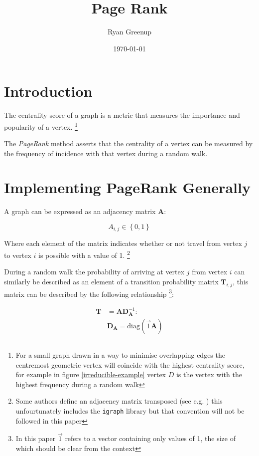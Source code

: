 \documentclass[11pt]{article}
\author{Ryan Greenup}
\date{\today}
\title{Page Rank}
\begin{document}
\maketitle
\tableofcontents


\section{Introduction}
\label{sec:org611d742}
The centrality score of a graph is a metric that measures the
importance and popularity of a vertex. \footnote{For a small graph drawn
in a way to minimise overlapping edges the centremost geometric vertex
will coincide with the highest centrality score, for example in figure
\ref{irreducible-example} vertex \(D\) is the vertex with the highest
frequency during a random walk}


The \emph{PageRank} method asserts that the centrality of a vertex can be
measured by the frequency of incidence with that vertex during a
random walk.

\section{Implementing PageRank Generally}
\label{PageRank-Generally}
A graph can be expressed as an adjacency matrix \(\mathbf{A}\):

\[
A_{i,j} \in \left\{ 0,1 \right\}
\]

Where each element of the matrix indicates whether or not travel from
vertex \(j\) to vertex \(i\) is possible with a value of 1. \footnote{Some
authors define an adjacency matrix transposed (see e.g.
\cite{rosenDiscreteMathematicsIts2007,AdjacencyMatrix2020a,meghabghabSearchEnginesLink2008})
this unfourtunately includes the \texttt{igraph} library
\cite{gaborcsardiIgraphManualPages2019} but that convention will not be
followed in this paper}

During a random walk the probability of arriving at vertex \(j\) from vertex
\(i\) can similarly be described as an element of a transition probability
matrix \(\mathbf{T}_{i,j}\), this matrix can be described by the following
relationship \footnote{In this paper \(\vec{1}\) refers to a vector containing only
values of 1, the size of which should be clear from the context}:

\begin{align}
\mathbf{T} &= \mathbf{A} \mathbf{D}^{-1}_{\mathbf{A}} \label{eq:basic-trans-def} : \\
& \mathbf{D}_{\mathbf{A}} = \mathrm{diag}\left(\vec{1} \mathbf{A}\right) \label{eq:diagScaleDef}
\end{align}
\end{document}
